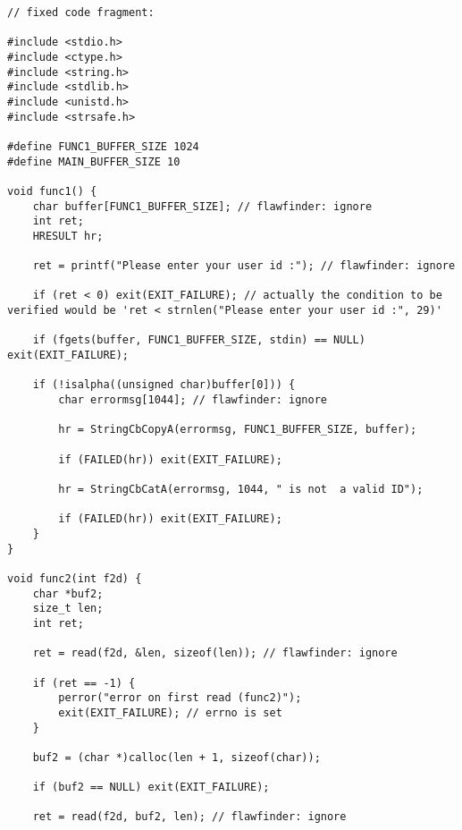 
\begin{lstlisting}
// fixed code fragment:

#include <stdio.h>
#include <ctype.h>
#include <string.h>
#include <stdlib.h>
#include <unistd.h>
#include <strsafe.h>

#define FUNC1_BUFFER_SIZE 1024
#define MAIN_BUFFER_SIZE 10

void func1() {	
    char buffer[FUNC1_BUFFER_SIZE]; // flawfinder: ignore
    int ret;
    HRESULT hr;
    
    ret = printf("Please enter your user id :"); // flawfinder: ignore
    
    if (ret < 0) exit(EXIT_FAILURE); // actually the condition to be verified would be 'ret < strnlen("Please enter your user id :", 29)'
    
    if (fgets(buffer, FUNC1_BUFFER_SIZE, stdin) == NULL) exit(EXIT_FAILURE);
    
    if (!isalpha((unsigned char)buffer[0])) {
        char errormsg[1044]; // flawfinder: ignore
        
        hr = StringCbCopyA(errormsg, FUNC1_BUFFER_SIZE, buffer);
        
        if (FAILED(hr)) exit(EXIT_FAILURE);
        
        hr = StringCbCatA(errormsg, 1044, " is not  a valid ID");
        
        if (FAILED(hr)) exit(EXIT_FAILURE);
 	}
}

void func2(int f2d) {
    char *buf2;
    size_t len;
    int ret;

    ret = read(f2d, &len, sizeof(len)); // flawfinder: ignore
    
    if (ret == -1) {
    	perror("error on first read (func2)");
		exit(EXIT_FAILURE); // errno is set
	}
	
    buf2 = (char *)calloc(len + 1, sizeof(char));
    
    if (buf2 == NULL) exit(EXIT_FAILURE);
    
    ret = read(f2d, buf2, len); // flawfinder: ignore
    

\end{lstlisting}
